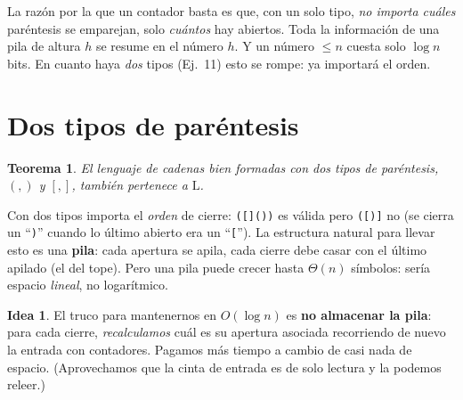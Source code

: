 \documentclass[11pt,a4paper]{article}
\theoremstyle{plain}
\newtheorem{teorema}{Teorema}
\theoremstyle{definition}
\newtheorem*{idea}{Idea}
\newcommand{\Lclass}{\mathrm{L}}
\begin{document}
\begin{porque}
La raz\'on por la que un contador basta es que, con un solo tipo, \emph{no importa
cu\'ales} par\'entesis se emparejan, solo \emph{cu\'antos} hay abiertos. Toda la
informaci\'on de una pila de altura $h$ se resume en el n\'umero $h$. Y un n\'umero
$\le n$ cuesta solo $\log n$ bits. En cuanto haya \emph{dos} tipos (Ej.\ 11) esto se
rompe: ya importar\'a el orden.
\end{porque}

\section{Dos tipos de par\'entesis}

\begin{teorema}
El lenguaje de cadenas bien formadas con dos tipos de par\'entesis, $(,)$ y $[,]$,
tambi\'en pertenece a $\Lclass$.
\end{teorema}

\begin{concepto}
Con dos tipos importa el \emph{orden} de cierre: \texttt{([]())} es v\'alida pero
\texttt{([)]} no (se cierra un ``\texttt{)}'' cuando lo \'ultimo abierto era un
``\texttt{[}''). La estructura natural para llevar esto es una \textbf{pila}: cada
apertura se apila, cada cierre debe casar con el \'ultimo apilado (el del tope).
Pero una pila puede crecer hasta $\Theta(n)$ s\'imbolos: ser\'ia espacio
\emph{lineal}, no logar\'itmico.
\end{concepto}

\begin{idea}
El truco para mantenernos en $O(\log n)$ es \textbf{no almacenar la pila}: para cada
cierre, \emph{recalculamos} cu\'al es su apertura asociada recorriendo de nuevo la
entrada con contadores. Pagamos m\'as tiempo a cambio de casi nada de espacio.
(Aprovechamos que la cinta de entrada es de solo lectura y la podemos releer.)
\end{idea}
\end{document}
